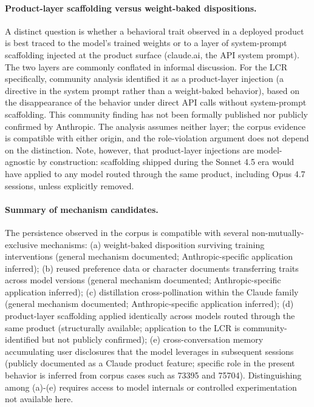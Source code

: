 \documentclass[11pt]{article}
\begin{document}
\paragraph{Product-layer scaffolding versus weight-baked dispositions.} A distinct question is whether a behavioral trait observed in a deployed product is best traced to the model's trained weights or to a layer of system-prompt scaffolding injected at the product surface (claude.ai, the API system prompt). The two layers are commonly conflated in informal discussion. For the LCR specifically, community analysis identified it as a product-layer injection (a directive in the system prompt rather than a weight-baked behavior), based on the disappearance of the behavior under direct API calls without system-prompt scaffolding. This community finding has not been formally published nor publicly confirmed by Anthropic. The analysis assumes neither layer; the corpus evidence is compatible with either origin, and the role-violation argument does not depend on the distinction. Note, however, that product-layer injections are model-agnostic by construction: scaffolding shipped during the Sonnet 4.5 era would have applied to any model routed through the same product, including Opus 4.7 sessions, unless explicitly removed.

\paragraph{Summary of mechanism candidates.} The persistence observed in the corpus is compatible with several non-mutually-exclusive mechanisms: (a) weight-baked disposition surviving training interventions (general mechanism documented; Anthropic-specific application inferred); (b) reused preference data or character documents transferring traits across model versions (general mechanism documented; Anthropic-specific application inferred); (c) distillation cross-pollination within the Claude family (general mechanism documented; Anthropic-specific application inferred); (d) product-layer scaffolding applied identically across models routed through the same product (structurally available; application to the LCR is community-identified but not publicly confirmed); (e) cross-conversation memory accumulating user disclosures that the model leverages in subsequent sessions (publicly documented as a Claude product feature; specific role in the present behavior is inferred from corpus cases such as 73395 and 75704). Distinguishing among (a)-(e) requires access to model internals or controlled experimentation not available here.
\end{document}
